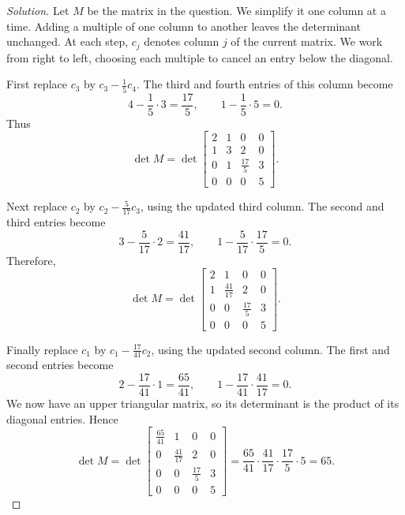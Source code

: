 \begin{proof}[Solution]
Let \(M\) be the matrix in the question. We simplify it one column at a
time. Adding a multiple of one
column to another leaves the determinant unchanged. At each step,
\(c_j\) denotes column \(j\) of the current matrix.
We work from right to left, choosing each multiple to cancel an entry
below the diagonal.

First replace \(c_3\) by \(c_3-\frac15c_4\). The third and fourth
entries of this column become
\[
  4-\frac15\cdot3=\frac{17}{5},\qquad
  1-\frac15\cdot5=0.
\]
Thus
\[
  \det M=\det\begin{bmatrix}
    2&1&0&0\\
    1&3&2&0\\
    0&1&\tfrac{17}{5}&3\\
    0&0&0&5
  \end{bmatrix}.
\]

Next replace \(c_2\) by \(c_2-\frac{5}{17}c_3\), using the updated
third column. The second and third entries become
\[
  3-\frac{5}{17}\cdot2=\frac{41}{17},\qquad
  1-\frac{5}{17}\cdot\frac{17}{5}=0.
\]
Therefore,
\[
  \det M=\det\begin{bmatrix}
    2&1&0&0\\
    1&\tfrac{41}{17}&2&0\\
    0&0&\tfrac{17}{5}&3\\
    0&0&0&5
  \end{bmatrix}.
\]

Finally replace \(c_1\) by \(c_1-\frac{17}{41}c_2\), using the
updated second column. The first and second entries become
\[
  2-\frac{17}{41}\cdot1=\frac{65}{41},\qquad
  1-\frac{17}{41}\cdot\frac{41}{17}=0.
\]
We now have an upper triangular matrix, so its determinant is the product
of its diagonal entries. Hence
\[
  \det M=\det\begin{bmatrix}
    \tfrac{65}{41}&1&0&0\\
    0&\tfrac{41}{17}&2&0\\
    0&0&\tfrac{17}{5}&3\\
    0&0&0&5
  \end{bmatrix}
  =\frac{65}{41}\cdot\frac{41}{17}\cdot\frac{17}{5}\cdot5
  =65.
\]
\end{proof}
